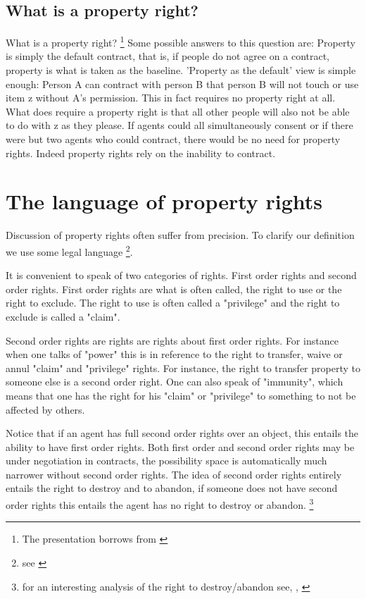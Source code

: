 \documentclass[12pt]{article}
\numberwithin{equation}{section}
\begin{document}
\newpage


\subsection{What is a property right?}

What is a property right? \footnote{The presentation borrows from \cite{Munzer1990}}
Some possible answers to this question are: Property is simply the default contract, that is, if people do not agree on a contract, property is what is taken as the baseline. 'Property as the default' view is simple enough: Person A can contract with person B that person B will not touch or use item z without A's permission. This in fact requires no property right at all. What does require a property right is that all other people will also not be able to do with z as they please. If agents could all simultaneously consent or if there were but two agents who could contract, there would be no need for property rights. Indeed property rights rely on the inability to contract. 



\section{The language of property rights}

Discussion of property rights often suffer from precision. To clarify our definition we use some legal language \footnote{see \cite{Hohfeld}}. 

It is convenient to speak of two categories of rights. First order rights and second order rights. First order rights are what is often called, the right to use or the right to exclude. The right to use is often called a "privilege" and the right to exclude is called a "claim". 

Second order rights are rights are rights about first order rights. For instance when one talks of "power" this is in reference to the right to transfer, waive or annul "claim" and "privilege" rights. For instance, the right to transfer property to someone else is a second order right. One can also speak of "immunity", which means that one has the right for his "claim" or "privilege" to something to not be affected by others. 

Notice that if an agent has full second order rights over an object, this entails the ability to have first order rights. Both first order and second order rights may be under negotiation in contracts, the possibility space is automatically much narrower without second order rights. The idea of second order rights entirely entails the right to destroy and to abandon, if someone does not have second order rights this entails the agent has no right to destroy or abandon. \footnote{for an interesting analysis of the right to destroy/abandon see, \cite{Strahilevitz2005}, \cite{Strahilevitz2009}} 
\end{document}
